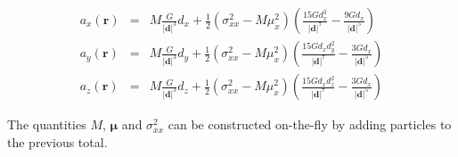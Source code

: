 \documentclass[a4paper,10pt]{article}
\newcommand{\rr}{\mathbf{r}}
\newcommand{\dd}{\mathbf{d}}
\newcommand{\p}[1]{\mathbf{p}_#1}
\newcommand{\muu}{\boldsymbol{\mu}}
\begin{document}
\begin{eqnarray}
 a_x(\rr) &=& M\frac{G}{|\dd|^3} d_x + \frac{1}{2}\left(\sigma_{xx}^2 - M\mu_x^2\right)\left(\frac{15Gd_x^3}{|\dd|^7} - 
\frac{9Gd_x}{|\dd|^5}\right)\\
 a_y(\rr) &=& M\frac{G}{|\dd|^3} d_y + \frac{1}{2}\left(\sigma_{xx}^2 - 
M\mu_x^2\right)\left(\frac{15Gd_xd_y^2}{|\dd|^7}- 
\frac{3Gd_x}{|\dd|^5}\right) \\
 a_z(\rr) &=& M\frac{G}{|\dd|^3} d_z + \frac{1}{2}\left(\sigma_{xx}^2 - 
M\mu_x^2\right)\left(\frac{15Gd_xd_z^2}{|\dd|^7}- 
\frac{3Gd_x}{|\dd|^5}\right)
\end{eqnarray}

The quantities $M$, $\muu$ and $\sigma_{xx}^2$ can be constructed on-the-fly by adding particles to the previous total.

% 
% 
% 
% 
% 
% 
% 
% 
% 
\end{document}
